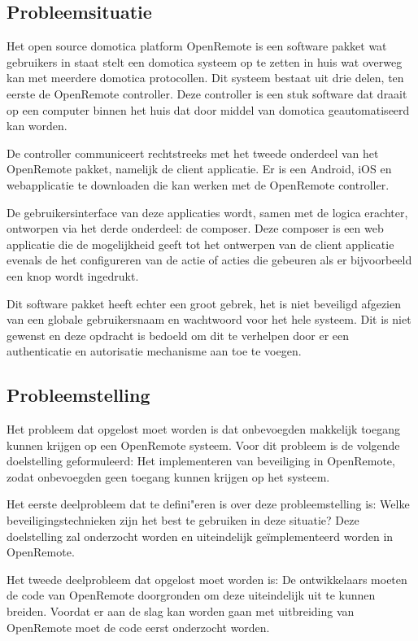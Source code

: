 \documentclass[]{article}
\begin{document}
\subsection{Probleemsituatie}

Het open source domotica platform OpenRemote is een software pakket wat
gebruikers in staat stelt een domotica systeem op te zetten in huis wat
overweg kan met meerdere domotica protocollen. Dit systeem bestaat uit drie
delen, ten eerste de OpenRemote controller. Deze controller is een stuk
software dat draait op een computer binnen het huis dat door middel van
domotica geautomatiseerd kan worden.

De controller communiceert rechtstreeks met het tweede onderdeel van het
OpenRemote pakket, namelijk de client applicatie. Er is een Android, iOS en
webapplicatie te downloaden die kan werken met de OpenRemote controller.

De gebruikersinterface van deze applicaties wordt, samen met de logica
erachter, ontworpen via het derde onderdeel: de composer. Deze composer is
een web applicatie die de mogelijkheid geeft tot het ontwerpen van de
client applicatie evenals de het configureren van de actie of acties die
gebeuren als er bijvoorbeeld een knop wordt ingedrukt.

Dit software pakket heeft echter een groot gebrek, het is niet beveiligd
afgezien van een globale gebruikersnaam en wachtwoord voor het hele
systeem. Dit is niet gewenst en deze opdracht is bedoeld om dit te verhelpen door
er een authenticatie en autorisatie mechanisme aan toe te voegen.

\subsection{Probleemstelling}

Het probleem dat opgelost moet worden is dat onbevoegden makkelijk toegang
kunnen krijgen op een OpenRemote systeem. Voor dit probleem is de
volgende doelstelling geformuleerd: Het implementeren van beveiliging in
OpenRemote, zodat onbevoegden geen toegang kunnen krijgen op het systeem.

Het eerste deelprobleem dat te defini"eren is over deze probleemstelling is:
Welke beveiligingstechnieken zijn het best te gebruiken in deze situatie?
Deze doelstelling zal onderzocht worden en uiteindelijk ge\"implementeerd worden in OpenRemote.

Het tweede deelprobleem dat opgelost moet worden is: De ontwikkelaars
moeten de code van OpenRemote doorgronden om deze uiteindelijk uit te
kunnen breiden. Voordat er aan de slag kan worden gaan met uitbreiding van
OpenRemote moet de code eerst onderzocht worden.
\end{document}
